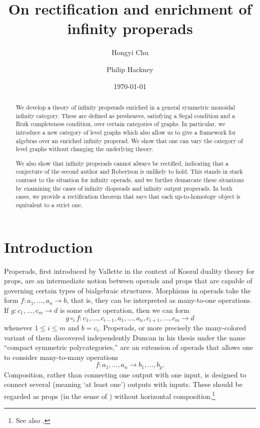 \documentclass{amsart}
\title{On rectification and enrichment of infinity properads}
\author{Hongyi Chu}
\author{Philip Hackney}
\date{\today}
\numberwithin{theorem}{subsection}
\theoremstyle{definition}
\begin{document}
\begin{abstract}
We develop a theory of infinity properads enriched in a general symmetric monoidal infinity category.
These are defined as presheaves, satisfying a Segal condition and a Rezk completeness condition, over certain categories of graphs.
In particular, we introduce a new category of level graphs which also allow us to give a framework for algebras over an enriched infinity properad.
We show that one can vary the category of level graphs without changing the underlying theory.

We also show that infinity properads cannot always be rectified, indicating that a conjecture of the second author and Robertson is unlikely to hold.
This stands in stark contrast to the situation for infinity operads, and we further demarcate these situations by examining the cases of infinity dioperads and infinity output properads.
In both cases, we provide a rectification theorem that says that each up-to-homotopy object is equivalent to a strict one.
\end{abstract}

\maketitle

\tableofcontents

\section{Introduction}

Properads, first introduced by Vallette \cite{Vallette:KDP} in the context of Koszul duality theory for props, are an intermediate notion between operads and props that are capable of governing certain types of bialgebraic structures.
Morphisms in operads take the form $f \colon a_1, \dots, a_n \to b$, that is, they can be interpreted as many-to-one operations.
If $g \colon c_1, \dots, c_m \to d$ is some other operation, then we can form \[ g\circ_i f \colon c_1, \dots, c_{i-1}, a_1, \dots, a_n, c_{i+1}, \dots, c_m \to d\]  whenever $1\leq i \leq m$ and $b = c_i.$
Properads, or more precisely the many-colored variant of them discovered independently Duncan in his thesis \cite[\S6.1]{Duncan:TQC} under the name ``compact symmetric polycategories,'' are an extension of operads that allows one to consider many-to-many operations \[f \colon a_1, \dots, a_n \to b_1, \dots, b_p.\]
Composition, rather than connecting one output with one input, is designed to connect several (meaning `at least one') outputs with inputs.
These should be regarded as props (in the sense of \cite[\S24]{MacLane:CA}) without horizontal composition.\footnote{See also \cite[p.80]{Duncan:TQC}.}
\end{document}
